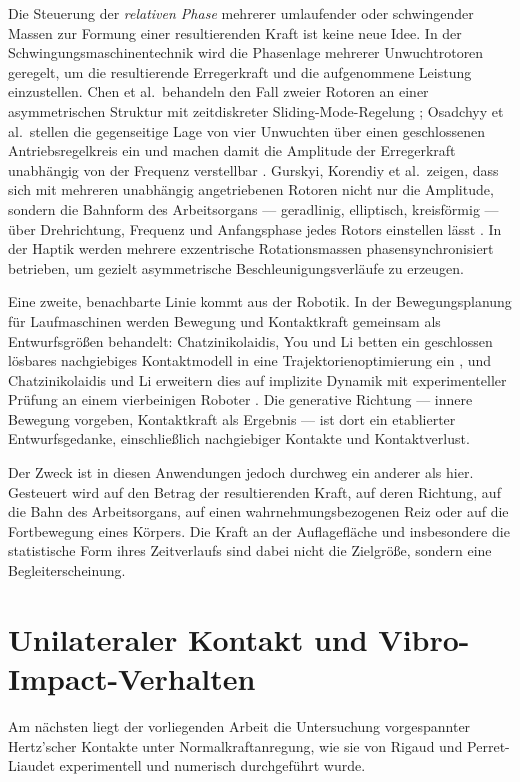 \documentclass[12pt,a4paper]{report}
\begin{document}
Die Steuerung der \emph{relativen Phase} mehrerer umlaufender oder
schwingender Massen zur Formung einer resultierenden Kraft ist keine neue
Idee. In der Schwingungsmaschinentechnik wird die Phasenlage mehrerer
Unwuchtrotoren geregelt, um die resultierende Erregerkraft und die
aufgenommene Leistung einzustellen. Chen et al.\ behandeln den Fall
zweier Rotoren an einer asymmetrischen Struktur mit zeitdiskreter
Sliding-Mode-Regelung \cite{chen2019}; Osadchyy et al.\ stellen die
gegenseitige Lage von vier Unwuchten über einen geschlossenen
Antriebsregelkreis ein und machen damit die Amplitude der Erregerkraft
unabhängig von der Frequenz verstellbar \cite{osadchyy2023}. Gurskyi,
Korendiy et al.\ zeigen, dass sich mit mehreren unabhängig
angetriebenen Rotoren nicht nur die Amplitude, sondern die Bahnform
des Arbeitsorgans --- geradlinig, elliptisch, kreisförmig --- über
Drehrichtung, Frequenz und Anfangsphase jedes Rotors einstellen lässt
\cite{gurskyi2023}. In der Haptik werden mehrere exzentrische
Rotationsmassen phasensynchronisiert betrieben, um gezielt
asymmetrische Beschleunigungsverläufe zu erzeugen.

Eine zweite, benachbarte Linie kommt aus der Robotik. In der
Bewegungsplanung für Laufmaschinen werden Bewegung und Kontaktkraft
gemeinsam als Entwurfsgrößen behandelt: Chatzinikolaidis, You und Li
betten ein geschlossen lösbares nachgiebiges Kontaktmodell in eine
Trajektorienoptimierung ein \cite{chatzinikolaidis2020}, und
Chatzinikolaidis und Li erweitern dies auf implizite Dynamik mit
experimenteller Prüfung an einem vierbeinigen Roboter
\cite{chatzinikolaidis2021}. Die generative Richtung --- innere
Bewegung vorgeben, Kontaktkraft als Ergebnis --- ist dort ein
etablierter Entwurfsgedanke, einschließlich nachgiebiger Kontakte und
Kontaktverlust.

Der Zweck ist in diesen Anwendungen jedoch durchweg ein anderer als hier.
Gesteuert wird auf den Betrag der resultierenden Kraft, auf deren
Richtung, auf die Bahn des Arbeitsorgans, auf einen
wahrnehmungsbezogenen Reiz oder auf die Fortbewegung eines Körpers. Die Kraft an der
Auflagefläche und insbesondere die statistische Form ihres Zeitverlaufs
sind dabei nicht die Zielgröße, sondern eine Begleiterscheinung.

\section{Unilateraler Kontakt und Vibro-Impact-Verhalten}
\label{sec:stand-kontakt}

Am nächsten liegt der vorliegenden Arbeit die Untersuchung
vorgespannter Hertz'scher Kontakte unter Normalkraftanregung, wie sie
von Rigaud und Perret-Liaudet experimentell und numerisch durchgeführt
wurde.
\end{document}
